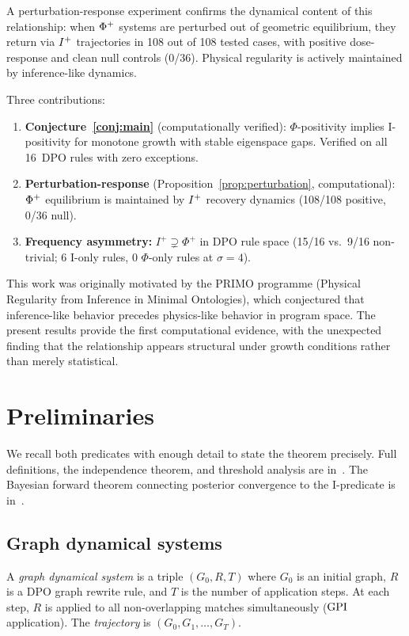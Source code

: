 \documentclass{../shared/primo}
\begin{document}
A perturbation-response experiment confirms the dynamical content of this relationship: when $\Phi\textsuperscript{+}$ systems are perturbed out of geometric equilibrium, they return via $I\textsuperscript{+}$ trajectories in 108 out of 108 tested cases, with positive dose-response and clean null controls (0/36). Physical regularity is actively maintained by inference-like dynamics.

Three contributions:
\begin{enumerate}
\item \textbf{Conjecture~\ref{conj:main}} (computationally verified): $\Phi$-positivity implies I-positivity for monotone growth with stable eigenspace gaps. Verified on all 16~DPO rules with zero exceptions.
\item \textbf{Perturbation-response} (Proposition~\ref{prop:perturbation}, computational): $\Phi\textsuperscript{+}$ equilibrium is maintained by $I\textsuperscript{+}$ recovery dynamics (108/108 positive, 0/36 null).
\item \textbf{Frequency asymmetry:} $I^+ \supsetneq \Phi^+$ in DPO rule space (15/16 vs.\ 9/16 non-trivial; 6 I-only rules, 0 $\Phi$-only rules at $\sigma = 4$).
\end{enumerate}

This work was originally motivated by the PRIMO programme (Physical Regularity from Inference in Minimal Ontologies), which conjectured that inference-like behavior precedes physics-like behavior in program space. The present results provide the first computational evidence, with the unexpected finding that the relationship appears structural under growth conditions rather than merely statistical.


\section{Preliminaries}
\label{sec:prelim}

We recall both predicates with enough detail to state the theorem precisely. Full definitions, the independence theorem, and threshold analysis are in~\cite{kowalczyk2026predicates}. The Bayesian forward theorem connecting posterior convergence to the I-predicate is in~\cite{kowalczyk2026bayesian}.

\subsection{Graph dynamical systems}

A \emph{graph dynamical system} is a triple $(G_0, R, T)$ where $G_0$ is an initial graph, $R$ is a DPO graph rewrite rule, and $T$ is the number of application steps. At each step, $R$ is applied to all non-overlapping matches simultaneously ($\mathrm{GPI}$ application). The \emph{trajectory} is $(G_0, G_1, \ldots, G_T)$.
\end{document}
